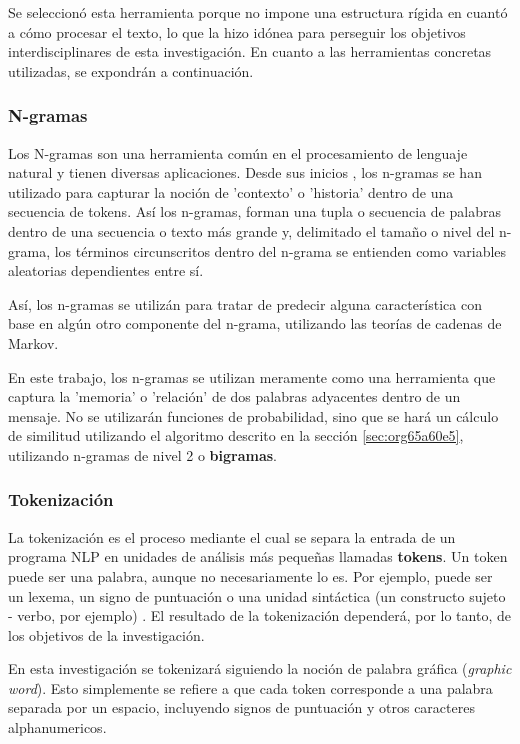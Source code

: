 \documentclass[12pt,letterpaper,twoside]{article}
\begin{document}
Se seleccionó esta herramienta porque no impone una estructura
rígida en cuantó a cómo procesar el texto, lo que la hizo
idónea para perseguir los objetivos interdisciplinares de esta
investigación. En cuanto a las herramientas concretas utilizadas,
se expondrán a continuación.

\subsubsection{N-gramas}
\label{sec:org540d5bb}

Los N-gramas son una herramienta común en el procesamiento
de lenguaje natural y tienen diversas aplicaciones. Desde sus
inicios \cite{manning1999foundations}, los n-gramas se han
utilizado para capturar la noción de 'contexto' o 'historia'
dentro de una secuencia de tokens. Así los n-gramas, forman
una tupla o secuencia de palabras dentro de una secuencia
o texto más grande y, delimitado el tamaño o nivel del
n-grama, los términos circunscritos dentro del n-grama
se entienden como variables aleatorias dependientes entre sí.

Así, los n-gramas se utilizán para tratar de predecir alguna
característica con base en algún otro componente del n-grama,
utilizando las teorías de cadenas de Markov.

En este trabajo, los n-gramas se utilizan meramente
como una herramienta que captura la 'memoria' o 'relación'
de dos palabras adyacentes dentro de un mensaje. No se
utilizarán funciones de probabilidad, sino que se hará
un cálculo de similitud utilizando el algoritmo descrito
en la sección  \ref{sec:org65a60e5}, utilizando
n-gramas de nivel 2 o \textbf{bigramas}.


\subsubsection{Tokenización}
\label{sec:org2bed25a}
La tokenización es el proceso mediante el cual se separa la entrada
de un programa NLP en unidades de análisis más pequeñas llamadas
\textbf{tokens}. Un token puede ser una palabra, aunque no necesariamente
lo es. Por ejemplo, puede ser un lexema, un signo de puntuación
o una unidad sintáctica (un constructo sujeto - verbo, por ejemplo)
\cite{manning1999foundations}. El resultado de la tokenización
dependerá, por lo tanto, de los objetivos de la investigación.

En esta investigación se tokenizará siguiendo la noción de
palabra gráfica (\emph{graphic word}). Esto simplemente se refiere
a que cada token corresponde a una palabra separada por un espacio,
incluyendo signos de puntuación y otros caracteres alphanumericos.
\end{document}
